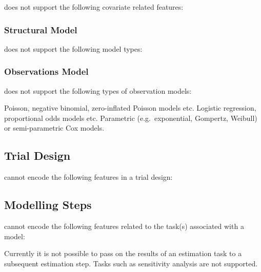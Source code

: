 \pharmml does not support the following covariate related features:
\begin{features}
\end{features}

\subsubsection{Structural Model}

\pharmml does not support the following model types:
\begin{features}
\end{features}

\subsubsection{Observations Model}

\pharmml does not support the following types of observation models:
\begin{features}
 Poisson, negative binomial, zero-inflated Poisson models etc.
 Logistic regression, proportional odds models etc.
 Parametric (e.g.\ exponential, Gompertz, Weibull) or semi-parametric Cox models.
\end{features}

\subsection{Trial Design}

\pharmml cannot encode the following features in a trial design:
\begin{features}
\end{features}

\subsection{Modelling Steps}

\pharmml cannot encode the following features related to the task(s) associated with a model:
\begin{features}
 Currently it is not possible to pass on the results of an estimation task to a subsequent estimation step.
 Tasks such as sensitivity analysis are not
supported.
\end{features}

